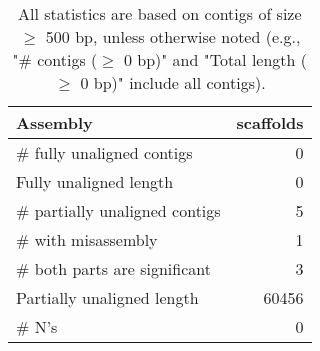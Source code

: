 \documentclass[12pt,a4paper]{article}
\begin{document}
\begin{table}[ht]
\begin{center}
\caption{All statistics are based on contigs of size $\geq$ 500 bp, unless otherwise noted (e.g., "\# contigs ($\geq$ 0 bp)" and "Total length ($\geq$ 0 bp)" include all contigs).}
\begin{tabular}{|l*{1}{|r}|}
\hline
Assembly & scaffolds \\ \hline
\# fully unaligned contigs & 0 \\ \hline
Fully unaligned length & 0 \\ \hline
\# partially unaligned contigs & 5 \\ \hline
\hspace{5mm}\# with misassembly & 1 \\ \hline
\hspace{5mm}\# both parts are significant & 3 \\ \hline
Partially unaligned length & 60456 \\ \hline
\# N's & 0 \\ \hline
\end{tabular}
\end{center}
\end{table}
\end{document}
